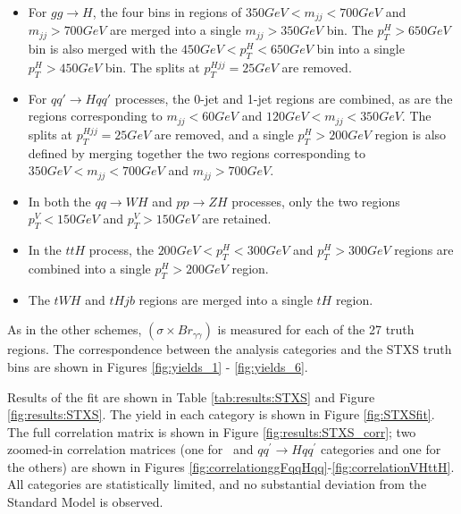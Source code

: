 \begin{itemize}
\item For $gg\rightarrow H$, the four bins in regions of $350 GeV < m_{jj} < 700 GeV$ and $m_{jj}> 700 GeV$ are merged into a single $m_{jj} > 350 GeV$ bin. The $p_{T}^{H} > 650 GeV$ bin is also merged with the $450 GeV < p_{T}^{H} < 650 GeV$ bin into a single $p_{T}^{H} > 450 GeV$ bin. The splits at $p_{T}^{Hjj}=25 GeV$ are removed.
\item For $qq' \rightarrow Hqq'$ processes, the 0-jet and 1-jet regions are combined, as are the regions corresponding to $m_{jj} < 60 GeV$ and $120 GeV < m_{jj} < 350 GeV$. The splits at $p_{T}^{Hjj}=25 GeV$ are removed, and a single  $p_{T}^{H} > 200 GeV$ region is also defined by merging together the two regions corresponding to $350 GeV < m_{jj}<700 GeV$ and $m_{jj}>700 GeV$.
\item In both the $qq \rightarrow WH$ and $pp \rightarrow ZH$ processes, only the two regions $p_{T}^{V} < 150 GeV$ and $p_{T}^{V} > 150 GeV$ are retained.
\item In the $ttH$ process, the $200 GeV < p_{T}^{H} < 300 GeV$ and $p_{T}^{H} > 300 GeV$ regions are combined into a single $p_{T}^{H} > 200 GeV$ region.
\item The $tWH$ and $tHjb$ regions are merged into a single $tH$ region.
\end{itemize}

As in the other schemes, $(\sigma \times Br_{\gamma \gamma})$ is measured for each of the 27 truth regions. The correspondence between the analysis categories and the STXS truth bins are shown in Figures \ref{fig:yields_1} - \ref{fig:yields_6}.

Results of the fit are shown in Table \ref{tab:results:STXS} and Figure \ref{fig:results:STXS}. The yield in each category is shown in Figure \ref{fig:STXSfit}. The full correlation matrix is shown in Figure \ref{fig:results:STXS_corr}; two zoomed-in correlation matrices (one for \ggtoH\ and $qq^\prime\to H qq^\prime$ categories and one for the others) are shown in Figures  \ref{fig:correlationggFqqHqq}-\ref{fig:correlationVHttH}. All categories are statistically limited, and no substantial deviation from the Standard Model is observed.

